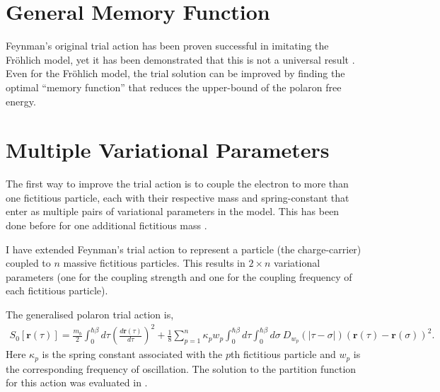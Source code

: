 \section{General Memory Function}

Feynman's original trial action has been proven successful in imitating the Fr\"ohlich model, yet it has been demonstrated that this is not a universal result \cite{Dries2016, Rosenfelder2001}. Even for the Fr\"ohlich model, the trial solution can be improved by finding the optimal ``memory function'' that reduces the upper-bound of the polaron free energy.

\section{Multiple Variational Parameters}

The first way to improve the trial action is to couple the electron to more than one fictitious particle, each with their respective mass and spring-constant that enter as multiple pairs of variational parameters in the model. This has been done before for one additional fictitious mass \cite{Abe1971}. 
\newline

I have extended Feynman's trial action to represent a particle (the charge-carrier) coupled to $n$ massive fictitious particles. This results in $2 \times n$ variational parameters (one for the coupling strength and one for the coupling frequency of each fictitious particle).
\newline

The generalised polaron trial action is,
\begin{equation} \label{eqn:multi_trial_action}
    \begin{gathered}
        S_{0}[\mathbf{r}(\tau)] =
        \frac{m_b}{2}\int^{\hbar \beta}_0 d\tau \left(\frac{d\mathbf{r}(\tau)}{d\tau}\right)^2 +
        \frac{1}{8} \sum_{p = 1}^n \kappa_{p} w_{p} \int^{\hbar\beta}_0 d\tau \int^{\hbar\beta}_0 d\sigma\ D_{w_p}(|\tau - \sigma|) (\mathbf{r}(\tau) - \mathbf{r}(\sigma))^{2} .
    \end{gathered}
\end{equation}
Here $\kappa_{p}$ is the spring constant associated with the $p$th fictitious particle and $w_{p}$ is the corresponding frequency of oscillation. The solution to the partition function for this action was evaluated in \cite{Poulter1992}.
\newline

